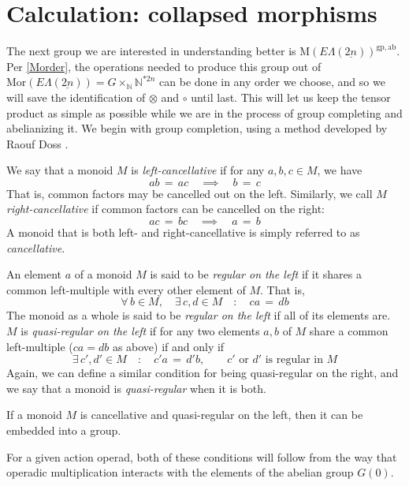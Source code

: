 \documentclass{amsbook} %
\newcommand{\ELnn}{E\Lambda(\underline{2n})}
\numberwithin{section}{chapter}
\begin{document}
\section{Calculation: collapsed morphisms}

The next group we are interested in understanding better is $\mathrm{M}(\ELnn)^{\mathrm{gp},\mathrm{ab}}$. Per \cref{Morder}, the operations needed to produce this group out of $\mathrm{Mor}(\ELnn) = G \times_{\mathbb{N}} \mathbb{N}^{\ast 2n}$ can be done in any order we choose, and so we will save the identification of $\otimes$ and $\circ$ until last. This will let us keep the tensor product as simple as possible while we are in the process of group completing and abelianizing it. We begin with group completion, using a method developed by Raouf Doss \cite{doss-imm}.

\begin{Defi} We say that a monoid $M$ is \emph{left-cancellative} if for any $a, b, c \in M$, we have
\[ ab \, = \, ac \quad \implies \quad b \, = \, c \]
That is, common factors may be cancelled out on the left. Similarly, we call $M$ \emph{right-cancellative} if common factors can be cancelled on the right:
\[ ac \, = \, bc \quad \implies \quad a \, = \, b \]
A monoid that is both left- and right-cancellative is simply referred to as \emph{cancellative}.
\end{Defi}

\begin{Defi} An element $a$ of a monoid $M$ is said to be \emph{regular on the left} if it shares a common left-multiple with every other element of $M$. That is,
\[ \forall \, b \in M, \quad \exists \, c, d \in M \quad : \quad ca \, = \, db \]
The monoid as a whole is said to be \emph{regular on the left} if all of its elements are.
 $M$ is \emph{quasi-regular on the left} if for any two elements $a,b$ of $M$ share a common left-multiple ($ca = db$ as above) if and only if
\[ \exists \, c', d' \in M \quad : \quad c'a \, = \, d'b, \quad \quad \text{$c'$ or $d'$ is regular in $M$} \]
Again, we can define a similar condition for being quasi-regular on the right, and we say that a monoid is \emph{quasi-regular} when it is both.
\end{Defi}

\begin{prop} If a monoid $M$ is cancellative and quasi-regular on the left, then it can be embedded into a group.
\end{prop}

For a given action operad, both of these conditions will follow from the way that operadic multiplication interacts with the elements of the abelian group $G(0)$.
\end{document}
